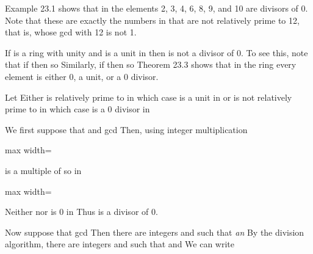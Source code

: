 \documentclass[11pt,oneside]{article}
\begin{document}
\begin{BookBody}

Example 23.1 shows that in  the elements 2, 3, 4, 6, 8, 9, and 10 are divisors of 0. Note that these are exactly the numbers in  that are not relatively prime to 12, that is, whose gcd with 12 is not 1.

If  is a ring with unity and  is a unit in  then  is not a divisor of 0. To see this, note that if  then  so  Similarly, if  then  so  Theorem 23.3 shows that in the ring  every element is either 0, a unit, or a 0 divisor.

 Let  Either  is relatively prime to  in which case  is a unit in  or  is not relatively prime to  in which case  is a 0 divisor in 

 We first suppose that  and gcd Then, using integer multiplication

\begin{center}\begin{adjustbox}{max width=\linewidth}\end{adjustbox}\end{center}

\noindent is a multiple of  so in 

\begin{center}\begin{adjustbox}{max width=\linewidth}\end{adjustbox}\end{center}

\noindent Neither  nor  is 0 in  Thus  is a divisor of 0.

Now suppose that gcd Then there are integers  and  such that \textit{an}  By the division algorithm, there are integers  and  such that \BookInline{0\leq }  and  We can write


\end{BookBody}
\end{document}
